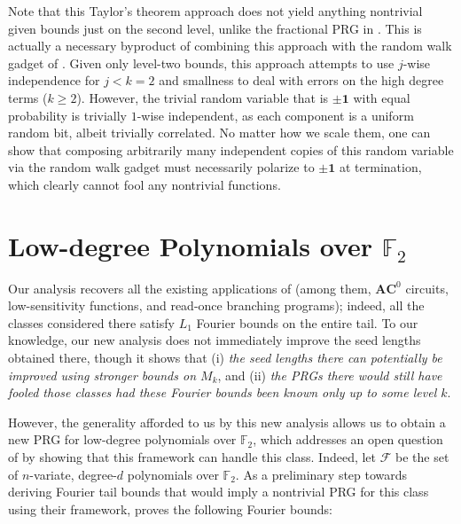 \begin{remark} \label{rem:lev-2}
Note that this Taylor's theorem approach does not yield anything nontrivial given bounds just on the second level, unlike the fractional PRG in \cite{CHLT}. This is actually a necessary byproduct of combining this approach with the random walk gadget of \cite{CHHL}. Given only level-two bounds, this approach attempts to use $j$-wise independence for $j<k=2$ and smallness to deal with errors on the high degree terms ($k\geq 2$). However, the trivial random variable that is $\pm \mathbf{1}$ with equal probability is trivially $1$-wise independent, as each component is a uniform random bit, albeit trivially correlated. No matter how we scale them, one can show that composing arbitrarily many independent copies of this random variable via the random walk gadget must necessarily polarize to $\pm \mathbf{1}$ at termination, which clearly cannot fool any nontrivial functions.  
\end{remark}




\section{Low-degree Polynomials over $\mathbb{F}_2$}
\label{sec:apps}

Our analysis recovers all the existing applications of \cite{CHHL} (among them, $\mathbf{AC}^0$ circuits, low-sensitivity functions, and read-once branching programs); indeed, all the classes considered there satisfy $L_1$ Fourier bounds on the entire tail. To our knowledge, our new analysis does not immediately improve the seed lengths obtained there, though it shows that (i) \emph{the seed lengths there can potentially be improved using stronger bounds on $M_k$}, and (ii) \emph{the PRGs there would still have fooled those classes had these Fourier bounds been known only up to some level $k$}.

However, the generality afforded to us by this new analysis allows us to obtain a new PRG for low-degree polynomials over $\mathbb{F}_2$, which addresses an open question of \cite{CHHL} by showing that this framework can handle this class. Indeed, let $\mathcal{F}$ be the set of $n$-variate, degree-$d$ polynomials over $\mathbb{F}_2$. As a preliminary step towards deriving Fourier tail bounds that would imply a nontrivial PRG for this class using their framework, \cite{CHHL} proves the following Fourier bounds:

